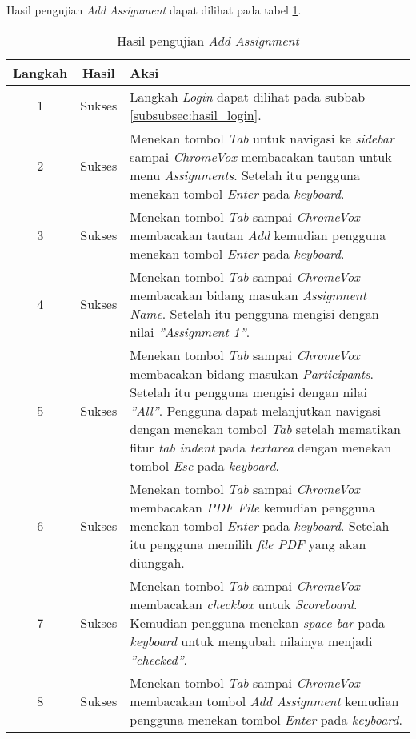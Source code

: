 Hasil pengujian \textit{Add Assignment} dapat dilihat pada tabel \ref{tab:hasil_add_assignment}.

\begin{table}[H]
	\centering
	\caption{Hasil pengujian \textit{Add Assignment}}
	\label{tab:hasil_add_assignment}
	\begin{tabular}{|c|c|p{12cm}|}
		\toprule
		Langkah & Hasil & Aksi\\
		\midrule
		1 & Sukses & Langkah \textit{Login} dapat dilihat pada subbab \ref{subsubsec:hasil_login}.\\
		2 & Sukses & Menekan tombol \textit{Tab} untuk navigasi ke \textit{sidebar} sampai \textit{ChromeVox} membacakan tautan untuk menu \textit{Assignments}. Setelah itu pengguna menekan tombol \textit{Enter} pada \textit{keyboard}.\\
		3 & Sukses & Menekan tombol \textit{Tab} sampai \textit{ChromeVox} membacakan tautan \textit{Add} kemudian pengguna menekan tombol \textit{Enter} pada \textit{keyboard}.\\
		4 & Sukses & Menekan tombol \textit{Tab} sampai \textit{ChromeVox} membacakan bidang masukan \textit{Assignment Name}. Setelah itu pengguna mengisi dengan nilai \textit{''Assignment 1''}.\\
		5 & Sukses & Menekan tombol \textit{Tab} sampai \textit{ChromeVox} membacakan bidang masukan \textit{Participants}. Setelah itu pengguna mengisi dengan nilai \textit{''All''}. Pengguna dapat melanjutkan navigasi dengan menekan tombol \textit{Tab} setelah mematikan fitur \textit{tab indent} pada \textit{textarea} dengan menekan tombol \textit{Esc} pada \textit{keyboard}.\\
		6 & Sukses & Menekan tombol \textit{Tab} sampai \textit{ChromeVox} membacakan \textit{PDF File} kemudian pengguna menekan tombol \textit{Enter} pada \textit{keyboard}. Setelah itu pengguna memilih \textit{file PDF} yang akan diunggah.\\
		7 & Sukses & Menekan tombol \textit{Tab} sampai \textit{ChromeVox} membacakan \textit{checkbox} untuk \textit{Scoreboard}. Kemudian pengguna menekan \textit{space bar} pada \textit{keyboard} untuk mengubah nilainya menjadi \textit{''checked''}.\\
		8 & Sukses & Menekan tombol \textit{Tab} sampai \textit{ChromeVox} membacakan tombol \textit{Add Assignment} kemudian pengguna menekan tombol \textit{Enter} pada \textit{keyboard}.\\
		\bottomrule
	\end{tabular}
\end{table}

